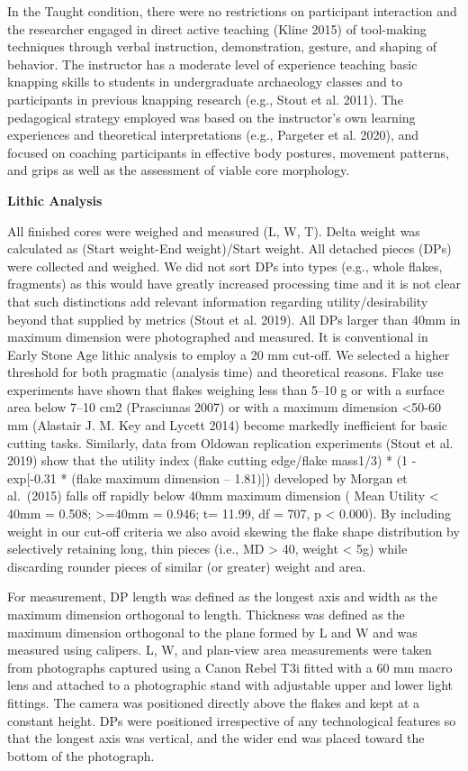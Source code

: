\documentclass[smallextended]{svjour3}       %
\begin{document}
In the Taught condition, there were no restrictions on participant
interaction and the researcher engaged in direct active teaching (Kline
2015) of tool-making techniques through verbal instruction,
demonstration, gesture, and shaping of behavior. The instructor has a
moderate level of experience teaching basic knapping skills to students
in undergraduate archaeology classes and to participants in previous
knapping research (e.g., Stout et al. 2011). The pedagogical strategy
employed was based on the instructor's own learning experiences and
theoretical interpretations (e.g., Pargeter et al. 2020), and focused on
coaching participants in effective body postures, movement patterns, and
grips as well as the assessment of viable core morphology.~ ~

\textbf{Lithic Analysis}

All finished cores were weighed and measured (L, W, T). Delta weight was
calculated as (Start weight-End weight)/Start weight. All detached
pieces (DPs) were collected and weighed. We did not sort DPs into types
(e.g., whole flakes, fragments) as this would have greatly increased
processing time and it is not clear that such distinctions add relevant
information regarding utility/desirability beyond that supplied by
metrics (Stout et al. 2019). All DPs larger than 40mm in maximum
dimension were photographed and measured. It is conventional in Early
Stone Age lithic analysis to employ a 20 mm cut-off. We selected a
higher threshold for both pragmatic (analysis time) and theoretical
reasons. Flake use experiments have shown that flakes weighing less than
5--10 g or with a surface area below 7--10 cm2 (Prasciunas 2007) or with
a maximum dimension \textless50-60 mm (Alastair J. M. Key and Lycett
2014) become markedly inefficient for basic cutting tasks. Similarly,
data from Oldowan replication experiments (Stout et al. 2019) show that
the utility index (flake cutting edge/flake mass1/3) * (1 - exp{[}-0.31
* (flake maximum dimension -- 1.81){]}) developed by Morgan et
al.~(2015) falls off rapidly below 40mm maximum dimension ( Mean Utility
\textless{} 40mm = 0.508; \textgreater=40mm = 0.946; t= 11.99, df = 707,
p \textless{} 0.000). By including weight in our cut-off criteria we
also avoid skewing the flake shape distribution by selectively retaining
long, thin pieces (i.e., MD \textgreater{} 40, weight \textless{} 5g)
while discarding rounder pieces of similar (or greater) weight and area.

For measurement, DP length was defined as the longest axis and width as
the maximum dimension orthogonal to length. Thickness was defined as the
maximum dimension orthogonal to the plane formed by L and W and was
measured using calipers. L, W, and plan-view area measurements were
taken from photographs captured using a Canon Rebel T3i fitted with a 60
mm macro lens and attached to a photographic stand with adjustable upper
and lower light fittings. The camera was positioned directly above the
flakes and kept at a constant height. DPs were positioned irrespective
of any technological features so that the longest axis was vertical, and
the wider end was placed toward the bottom of the photograph.
\end{document}
